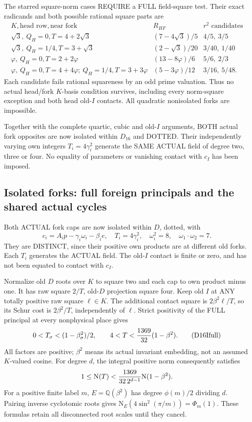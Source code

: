 \documentclass[11pt]{article}
\begin{document}
The starred square-norm cases REQUIRE
a FULL field-square test.
Their exact radicands and both possible
rational square parts are
\[
\begin{array}{c|c|c}
 K,\text{head row},\text{near fork}&R_{HF}&r^2\text{ candidates}\\ \hline
 \sqrt3,\ Q_H=0,T=4+2\sqrt3&(7-4\sqrt3)/5&4/5,\ 3/5\\
 \sqrt3,\ Q_H=1/4,T=3+\sqrt3&(2-\sqrt3)/20&3/40,\ 1/40\\
 \varphi,\ Q_H=0,T=2+2\varphi&(13-8\varphi)/6&5/6,\ 2/3\\
 \varphi,\ Q_H=0,T=4+4\varphi;\
 Q_H=1/4,T=3+3\varphi&(5-3\varphi)/12&3/16,\ 5/48 .
\end{array}
\]
Each candidate fails rational squareness
by an odd prime valuation.
Thus no actual head/fork \(K\)-basis
condition survives, including every
norm-square exception and both head
old-\(I\) contacts.
All quadratic nonisolated forks are
impossible.

Together with the complete quartic,
cubic and old-\(I\) arguments, BOTH
actual fork opposites are now isolated
within \(D_{16}\) and DOTTED.
Their independently varying own integers
\(T_i=4\gamma_i^2\) generate the SAME
ACTUAL field of degree two, three
or four.
No equality of parameters or vanishing
contact with \(c_I\) has been imposed.

\subsection{Isolated forks: full foreign principals and the shared actual cycles}
\label{app:arithD16Iisolatedcommon}

Both ACTUAL fork caps are now isolated
within \(D\), dotted, with
\[
            c_i=A_ip-\gamma_i\omega_i-\beta_i e,\quad
            T_i=4\gamma_i^2,\quad\omega_i^2=8,\quad
            \omega_1\cdot\omega_2=7 .
\]
They are DISTINCT, since their positive
own products are at different old forks.
Each \(T_i\) generates the ACTUAL field.
The old-\(I\) contact is finite or zero,
and has not been equated to contact
with \(c_I\).

Normalize old \(D\) roots over \(K\)
to square two and each cap to own
product minus one.
It has raw square \(2/T\), old-\(D\)
projection square four.
Keep old \(I\) at ANY totally positive
raw square \(\ell\in K\).
The additional contact square is
\(2\beta^2\ell/T\), so its Schur cost
is \(2\beta^2/T\), independently of
\(\ell\).
Strict positivity of the FULL principal
at every nonphysical place gives
\[
             0<T_\sigma<(1-\beta_\sigma^2)/2,\qquad
             4<T<{1369\over32}(1-\beta^2).
\tag{D16Ifull}\label{eq:arithD16Iisolatedfull}
\]
All factors are positive; \(\beta^2\)
means its actual invariant embedding,
not an assumed \(K\)-valued cosine.
For degree \(d\), the integral positive
norm consequently satisfies
\[
              1\le\mathrm N(T)<
                   {1369\over32\,2^{d-1}}\mathrm N(1-\beta^2).
\]
For a positive finite label \(m\),
\(E=\mathbb Q(\beta^2)\) has degree
\(\phi(m)/2\) dividing \(d\).
Pairing inverse cyclotomic roots gives
\(\mathrm N_E(4\sin^2(\pi/m))=\Phi_m(1)\).
These formulas retain all disconnected
root scales until they cancel.
\end{document}

